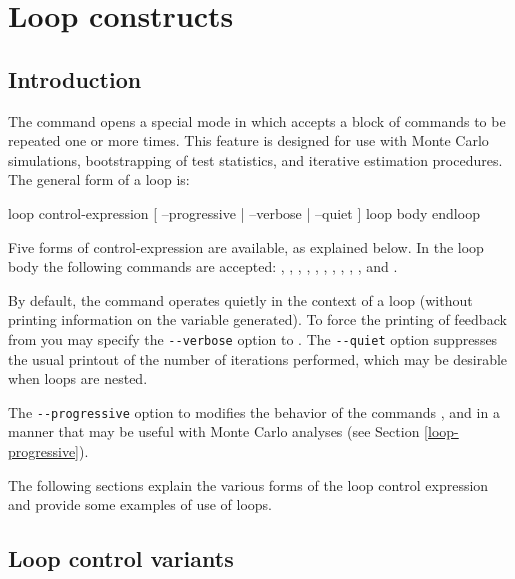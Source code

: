 \chapter{Loop constructs}
\label{looping}

\section{Introduction}
\label{loop-intro}

The command  opens a special mode in which 
accepts a block of commands to be repeated one or more times.  This
feature is designed for use with Monte Carlo simulations,
bootstrapping of test statistics, and iterative estimation procedures.
The general form of a loop is:

\begin{code}
      loop control-expression [ --progressive | --verbose | --quiet ]
         loop body
      endloop
\end{code}

Five forms of control-expression are available, as explained below.
In the loop body the following commands are accepted: ,
, , , , ,
, , , ,  and
.

By default, the  command operates quietly in the context of
a loop (without printing information on the variable generated).  To
force the printing of feedback from  you may specify the
\verb+--verbose+ option to .  The \verb+--quiet+ option
suppresses the usual printout of the number of iterations performed,
which may be desirable when loops are nested.

The \verb+--progressive+ option to  modifies the behavior of
the commands ,  and  in a manner that
may be useful with Monte Carlo analyses (see Section
\ref{loop-progressive}).
    
The following sections explain the various forms of the loop control
expression and provide some examples of use of loops.  


\section{Loop control variants}
\label{loop-control}

